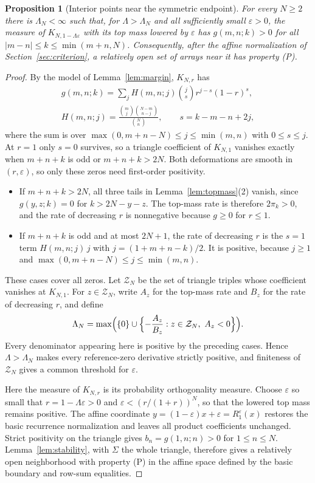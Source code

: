 \documentclass[twoside,10pt]{article}
\numberwithin{equation}{section}
\theoremstyle{slbody}
\newtheorem{proposition}[theorem]{Proposition}
\theoremstyle{definition}
\theoremstyle{remark}
\begin{document}
\begin{proposition}[Interior points near the symmetric endpoint]\label{prop:interior}
For every $N\geq2$ there is $\Lambda_N<\infty$ such that, for $\Lambda>\Lambda_N$ and all sufficiently small $\varepsilon>0$, the measure of $K_{N,1-\Lambda\varepsilon}$ with its top mass lowered by $\varepsilon$ has $g(m,n;k)>0$ for all $|m-n|\leq k\leq\min(m+n,N)$. Consequently, after the affine normalization of Section~\ref{sec:criterion}, a relatively open set of arrays near it has property (P).
\end{proposition}
\begin{proof}
By the model of Lemma~\ref{lem:margin}, $K_{N,r}$ has
\begin{gather*}
g(m,n;k)=\sum_jH(m,n;j)\binom js r^{j-s}(1-r)^s,\\
H(m,n;j)=\frac{\binom mj\binom{N-m}{n-j}}{\binom Nn},\qquad s=k-m-n+2j,
\end{gather*}
where the sum is over $\max(0,m+n-N)\leq j\leq\min(m,n)$ with $0\leq s\leq j$.
At $r=1$ only $s=0$ survives, so a triangle coefficient of $K_{N,1}$ vanishes exactly when $m+n+k$ is odd or $m+n+k>2N$. Both deformations are smooth in $(r,\varepsilon)$, so only these zeros need first-order positivity.
\begin{itemize}
\item If $m+n+k>2N$, all three tails in Lemma~\ref{lem:topmass}(2) vanish, since $g(y,z;k)=0$ for $k>2N-y-z$. The top-mass rate is therefore $2\pi_k>0$, and the rate of decreasing $r$ is nonnegative because $g\geq0$ for $r\leq1$.
\item If $m+n+k$ is odd and at most $2N+1$, the rate of decreasing $r$ is the $s=1$ term $H(m,n;j)\,j$ with $j=(1+m+n-k)/2$. It is positive, because $j\geq1$ and $\max(0,m+n-N)\leq j\leq\min(m,n)$.
\end{itemize}
These cases cover all zeros. Let $\mathcal Z_N$ be the set of triangle triples whose coefficient vanishes at $K_{N,1}$. For $z\in\mathcal Z_N$, write $A_z$ for the top-mass rate and $B_z$ for the rate of decreasing $r$, and define
\[
\Lambda_N=\max\Bigl(\{0\}\cup\Bigl\{-\frac{A_z}{B_z}:z\in\mathcal Z_N,\ A_z<0\Bigr\}\Bigr).
\]
Every denominator appearing here is positive by the preceding cases. Hence $\Lambda>\Lambda_N$ makes every reference-zero derivative strictly positive, and finiteness of $\mathcal Z_N$ gives a common threshold for $\varepsilon$.

Here the measure of $K_{N,r}$ is its probability orthogonality measure. Choose $\varepsilon$ so small that $r=1-\Lambda\varepsilon>0$ and $\varepsilon<(r/(1+r))^N$, so that the lowered top mass remains positive. The affine coordinate $y=(1-\varepsilon)x+\varepsilon=R_1^\varepsilon(x)$ restores the basic recurrence normalization and leaves all product coefficients unchanged. Strict positivity on the triangle gives $b_n=g(1,n;n)>0$ for $1\leq n\leq N$. Lemma~\ref{lem:stability}, with $\Sigma$ the whole triangle, therefore gives a relatively open neighborhood with property (P) in the affine space defined by the basic boundary and row-sum equalities.
\end{proof}
\end{document}

